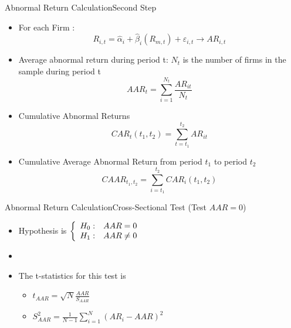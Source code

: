 \documentclass{beamer}
\begin{document}
\begin{frame}{Abnormal Return Calculation}{Second Step}
\begin{itemize}
\scriptsize
\item For each Firm :
\begin{equation*}
R_{i,t} = \hat{\alpha}_i + \hat{\beta}_i (R_{m,t}) + \boxed{\varepsilon_{i,t}} \rightarrow AR_{i,t}
\end{equation*}

\item Average abnormal return during period t: 
\tiny $ N_t $ is the number of firms in the sample during period t
\scriptsize
\begin{equation*}
AAR_t = \sum_{i=1}^{N_t} \frac{AR_{it}}{N_t}
\end{equation*}
\item Cumulative Abnormal Returns
\begin{equation*}
CAR_t(t_1,t_2) = \sum_{t=t_1}^{t_2} {AR_{it}}
\end{equation*}
\item Cumulative Average Abnormal Return from period $ t_1 $ to period $ t_2 $
\begin{equation*}
CAAR_{t_1,t_2} = \sum_{i=t_1}^{t_2} CAR_i(t_1,t_2)
\end{equation*}
\end{itemize}
\end{frame}


\begin{frame}{Abnormal Return Calculation}{Cross-Sectional Test (Test $ AAR=0 $)}


 \begin{itemize}
\item Hypothesis is  $\left\{\begin{array}{c c }
H_0: & AAR=0\\
H_1: & AAR\neq 0
\end{array}\right.
$\\
\item[]
\item The t-statistics for this test is 
\begin{itemize}
\item 
$
t_{AAR} = \sqrt{N}\frac{AAR}{S_{AAR}}
$
\item 
$
S^2_{AAR} = \frac{1}{N-1}\sum_{i = 1}^{N}(AR_i - {AAR})^2
$
\end{itemize}
\end{itemize}



\end{frame}
\end{document}
